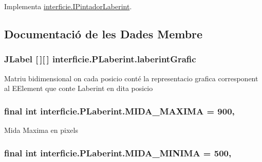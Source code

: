 Implementa \hyperlink{interfaceinterficie_1_1_i_pintador_laberint_ae8e250a2c2a2f745e6700bf65be9fe9a}{interficie.\+I\+Pintador\+Laberint}.



\subsection{Documentació de les Dades Membre}
\hypertarget{classinterficie_1_1_p_laberint_a7c0d3cba083c83e635532b8808affa94}{
\subsubsection[{laberint\+Grafic}]{\setlength{\rightskip}{0pt plus 5cm}J\+Label \mbox{[}$\,$\mbox{]}\mbox{[}$\,$\mbox{]} interficie.\+P\+Laberint.\+laberint\+Grafic\hspace{0.3cm}{\ttfamily [private]}}}\label{classinterficie_1_1_p_laberint_a7c0d3cba083c83e635532b8808affa94}
Matriu bidimensional on cada posicio conté la representacio grafica corresponent al E\+Element que conte Laberint en dita posicio \hypertarget{classinterficie_1_1_p_laberint_aae7e324b14c009ac1e2408956adbdcc0}{
\subsubsection[{M\+I\+D\+A\+\_\+\+M\+A\+X\+I\+M\+A}]{\setlength{\rightskip}{0pt plus 5cm}final int interficie.\+P\+Laberint.\+M\+I\+D\+A\+\_\+\+M\+A\+X\+I\+M\+A = 900\hspace{0.3cm}{\ttfamily [static]}, {\ttfamily [private]}}}\label{classinterficie_1_1_p_laberint_aae7e324b14c009ac1e2408956adbdcc0}
Mida Maxima en pixels \hypertarget{classinterficie_1_1_p_laberint_a3ae71ef7717557a52efdbb965038dc90}{
\subsubsection[{M\+I\+D\+A\+\_\+\+M\+I\+N\+I\+M\+A}]{\setlength{\rightskip}{0pt plus 5cm}final int interficie.\+P\+Laberint.\+M\+I\+D\+A\+\_\+\+M\+I\+N\+I\+M\+A = 500\hspace{0.3cm}{\ttfamily [static]}, {\ttfamily [private]}}}\label{classinterficie_1_1_p_laberint_a3ae71ef7717557a52efdbb965038dc90}
